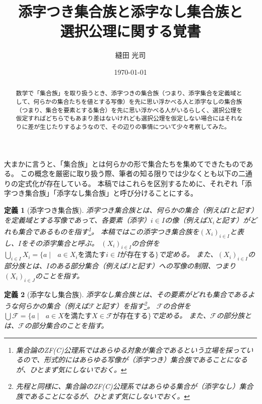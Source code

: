 \documentclass{jarticle}
\title{添字つき集合族と添字なし集合族と\\ 選択公理に関する覚書}
\author{縫田 光司}
\date{\today}
\newtheorem{definition}{定義}
\begin{document}
\maketitle

\begin{abstract}
数学で「集合族」を取り扱うとき、添字つきの集合族（つまり、添字集合を定義域として、何らかの集合たちを値とする写像）を先に思い浮かべる人と添字なしの集合族（つまり、集合を要素とする集合）を先に思い浮かべる人がいるらしく、選択公理を仮定すればどちらでもあまり差はないけれども選択公理を仮定しない場合にはそれなりに差が生じたりするようなので、その辺りの事情について少々考察してみた。
\end{abstract}

大まかに言うと、「集合族」とは何らかの形で集合たちを集めてできたものである。
この概念を厳密に取り扱う際、筆者の知る限りでは少なくとも以下の二通りの定式化が存在している。
本稿ではこれらを区別するために、それぞれ「添字つき集合族」「添字なし集合族」と呼び分けることにする。
\begin{definition}
[添字つき集合族]
\label{defn:indexed_set_family}
添字つき集合族とは、何らかの集合（例えば$I$と記す）を定義域とする写像であって、各要素（添字）$i \in I$の像（例えば$X_i$と記す）がどれも集合であるものを指す\footnote{集合論のZF(C)公理系ではあらゆる対象が集合であるという立場を採っているので、形式的にはあらゆる写像が（添字つき）集合族であることになるが、ひとまず気にしないでおく。}。
本稿ではこの添字つき集合族を$(X_i)_{i \in I}$と表し、$I$をその添字集合と呼ぶ。
$(X_i)_{i \in I}$の合併を$\bigcup_{i \in I} X_i = \{a \mid \mbox{ $a \in X_i$を満たす$i \in I$が存在する}\}$で定める。
また、$(X_i)_{i \in I}$の部分族とは、$I$のある部分集合（例えば$J$と記す）への写像の制限、つまり$(X_i)_{i \in J}$のことを指す。
\end{definition}
\begin{definition}
[添字なし集合族]
\label{defn:unindexed_set_family}
添字なし集合族とは、その要素がどれも集合であるような何らかの集合（例えば$\mathcal{F}$と記す）を指す\footnote{先程と同様に、集合論のZF(C)公理系ではあらゆる集合が（添字なし）集合族であることになるが、ひとまず気にしないでおく。}。
$\mathcal{F}$の合併を$\bigcup \mathcal{F} = \{a \mid \mbox{ $a \in X$を満たす$X \in \mathcal{F}$が存在する}\}$で定める。
また、$\mathcal{F}$の部分族とは、$\mathcal{F}$の部分集合のことを指す。
\end{definition}
\end{document}
